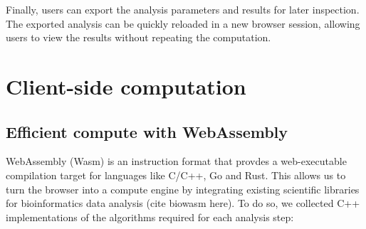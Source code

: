 \documentclass{article}
\begin{document}
Finally, users can export the analysis parameters and results for later inspection.
The exported analysis can be quickly reloaded in a new browser session, allowing users to view the results without repeating the computation.

\section{Client-side computation}

\subsection{Efficient compute with WebAssembly}

WebAssembly (Wasm) is an instruction format that provdes a web-executable compilation target for languages like C/C++, Go and Rust.
This allows us to turn the browser into a compute engine by integrating existing scientific libraries for bioinformatics data analysis (cite biowasm here).
To do so, we collected C++ implementations of the algorithms required for each analysis step:
\end{document}
